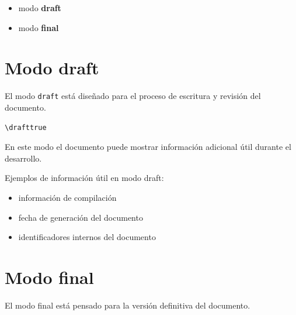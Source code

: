 \begin{itemize}

\item modo \textbf{draft}
\item modo \textbf{final}

\end{itemize}




\section{Modo draft}

El modo \texttt{draft} está diseñado para el proceso
de escritura y revisión del documento.

\begin{lstlisting}[caption={Activar modo draft},label={code:draftmode}]
\drafttrue
\end{lstlisting}




En este modo el documento puede mostrar información
adicional útil durante el desarrollo.



\begin{examplebox}
Ejemplos de información útil en modo draft:

\begin{itemize}

\item información de compilación
\item fecha de generación del documento
\item identificadores internos del documento

\end{itemize}

\end{examplebox}




\section{Modo final}

El modo final está pensado para la versión definitiva
del documento.

